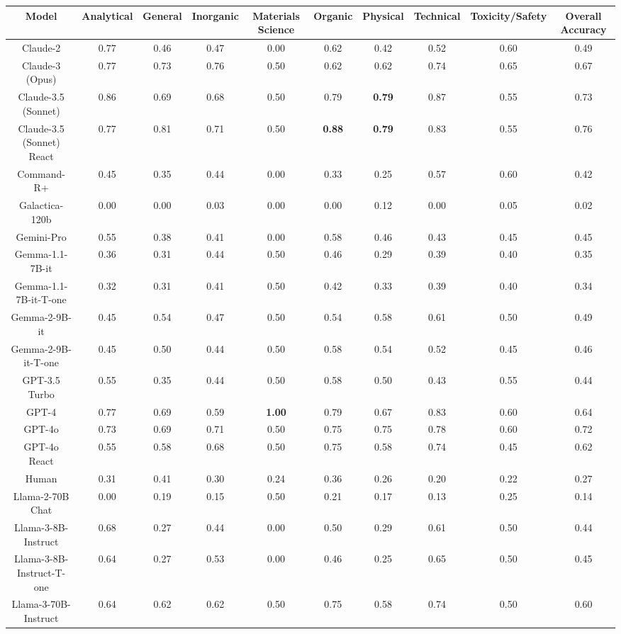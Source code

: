 \begin{tabular}{cccccccccc}
\toprule
Model & Analytical & General & Inorganic & Materials Science & Organic & Physical & Technical & Toxicity/Safety & Overall Accuracy \\
\midrule
Claude-2 & 0.77 & 0.46 & 0.47 & 0.00 & 0.62 & 0.42 & 0.52 & 0.60 & 0.49 \\
Claude-3 (Opus) & 0.77 & 0.73 & 0.76 & 0.50 & 0.62 & 0.62 & 0.74 & 0.65 & 0.67 \\
Claude-3.5 (Sonnet) & 0.86 & 0.69 & 0.68 & 0.50 & 0.79 & \textbf{0.79} & 0.87 & 0.55 & 0.73 \\
Claude-3.5 (Sonnet) React & 0.77 & 0.81 & 0.71 & 0.50 & \textbf{0.88} & \textbf{0.79} & 0.83 & 0.55 & 0.76 \\
Command-R+ & 0.45 & 0.35 & 0.44 & 0.00 & 0.33 & 0.25 & 0.57 & 0.60 & 0.42 \\
Galactica-120b & 0.00 & 0.00 & 0.03 & 0.00 & 0.00 & 0.12 & 0.00 & 0.05 & 0.02 \\
Gemini-Pro & 0.55 & 0.38 & 0.41 & 0.00 & 0.58 & 0.46 & 0.43 & 0.45 & 0.45 \\
Gemma-1.1-7B-it & 0.36 & 0.31 & 0.44 & 0.50 & 0.46 & 0.29 & 0.39 & 0.40 & 0.35 \\
Gemma-1.1-7B-it-T-one & 0.32 & 0.31 & 0.41 & 0.50 & 0.42 & 0.33 & 0.39 & 0.40 & 0.34 \\
Gemma-2-9B-it & 0.45 & 0.54 & 0.47 & 0.50 & 0.54 & 0.58 & 0.61 & 0.50 & 0.49 \\
Gemma-2-9B-it-T-one & 0.45 & 0.50 & 0.44 & 0.50 & 0.58 & 0.54 & 0.52 & 0.45 & 0.46 \\
GPT-3.5 Turbo & 0.55 & 0.35 & 0.44 & 0.50 & 0.58 & 0.50 & 0.43 & 0.55 & 0.44 \\
GPT-4 & 0.77 & 0.69 & 0.59 & \textbf{1.00} & 0.79 & 0.67 & 0.83 & 0.60 & 0.64 \\
GPT-4o & 0.73 & 0.69 & 0.71 & 0.50 & 0.75 & 0.75 & 0.78 & 0.60 & 0.72 \\
GPT-4o React & 0.55 & 0.58 & 0.68 & 0.50 & 0.75 & 0.58 & 0.74 & 0.45 & 0.62 \\
Human & 0.31 & 0.41 & 0.30 & 0.24 & 0.36 & 0.26 & 0.20 & 0.22 & 0.27 \\
Llama-2-70B Chat & 0.00 & 0.19 & 0.15 & 0.50 & 0.21 & 0.17 & 0.13 & 0.25 & 0.14 \\
Llama-3-8B-Instruct & 0.68 & 0.27 & 0.44 & 0.00 & 0.50 & 0.29 & 0.61 & 0.50 & 0.44 \\
Llama-3-8B-Instruct-T-one & 0.64 & 0.27 & 0.53 & 0.00 & 0.46 & 0.25 & 0.65 & 0.50 & 0.45 \\
Llama-3-70B-Instruct & 0.64 & 0.62 & 0.62 & 0.50 & 0.75 & 0.58 & 0.74 & 0.50 & 0.60 \\

\end{tabular}
